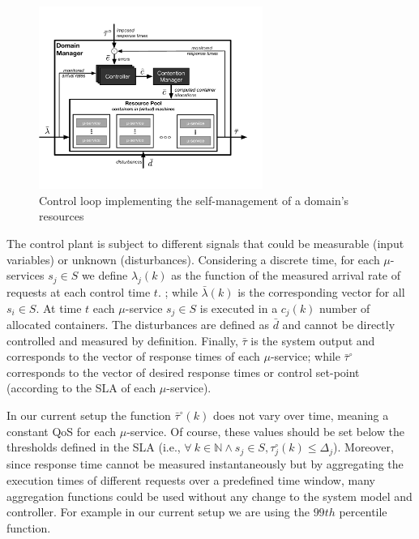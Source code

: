 \begin{figure}[tbp]
	\includegraphics[width=0.65\textwidth]{figs/domain-manager-allocation}
	\caption{Control loop implementing the self-management of a domain's resources}
	\label{fig:A3Edomain-manager}
\end{figure}



The control plant is subject to different signals that could be measurable (input variables) or unknown (disturbances). Considering a discrete time, for each $\mu$-services $s_j \in S$ we define $\lambda_j(k)$ as the function of the measured arrival rate of requests at each control time $t$.
; while $\bar{\lambda}(k)$ is the corresponding vector for all $s_i \in S$. 
At time $t$ each $\mu$-service $s_j \in S$ is executed in a $c_j(k)$ number of allocated containers.%
The disturbances are defined as $\bar{d}$ and cannot be directly controlled and measured by definition. Finally, $\bar{\tau}$ is the system output and corresponds to the vector of response times of each $\mu$-service; while $\bar{\tau}^\circ$ corresponds to the vector of desired response times or control set-point (according to the SLA of each $\mu$-service). 

In our current setup the function $\bar{\tau}^\circ(k)$ does not vary over time, meaning a constant QoS for each  $\mu$-service. Of course, these values should be set below the thresholds defined in the SLA (i.e., $\forall\ k \in \mathbb{N} \wedge  s_j \in S, {\tau}^\circ_j(k) \le \Delta_j$). Moreover, since response time cannot be measured instantaneously but by aggregating the execution times of different requests over a predefined time window, many aggregation functions could be used without any change to the system model and controller. For example in our current setup we are using the $99th$ percentile function. 

